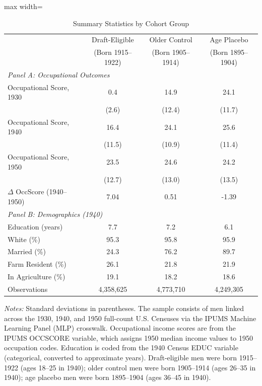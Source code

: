 \begin{table}[htbp]
\centering
\caption{Summary Statistics by Cohort Group}
\label{tab:sumstats}
\begin{adjustbox}{max width=\textwidth}
\begin{tabular}{lccc}
\toprule
 & Draft-Eligible & Older Control & Age Placebo \\
 & (Born 1915--1922) & (Born 1905--1914) & (Born 1895--1904) \\
\midrule
\multicolumn{4}{l}{\textit{Panel A: Occupational Outcomes}} \\[3pt]
Occupational Score, 1930 & 0.4 & 14.9 & 24.1 \\
 & (2.6) & (12.4) & (11.7) \\[3pt]
Occupational Score, 1940 & 16.4 & 24.1 & 25.6 \\
 & (11.5) & (10.9) & (11.4) \\[3pt]
Occupational Score, 1950 & 23.5 & 24.6 & 24.2 \\
 & (12.7) & (13.0) & (13.5) \\[3pt]
$\Delta$ OccScore (1940--1950) & 7.04 & 0.51 & -1.39 \\
\midrule
\multicolumn{4}{l}{\textit{Panel B: Demographics (1940)}} \\[3pt]
Education (years) & 7.7 & 7.2 & 6.1 \\
White (\%) & 95.3 & 95.8 & 95.9 \\
Married (\%) & 24.3 & 76.2 & 89.7 \\
Farm Resident (\%) & 26.1 & 21.8 & 21.9 \\
In Agriculture (\%) & 19.1 & 18.2 & 18.6 \\
\midrule
Observations & 4,358,625 & 4,773,710 & 4,249,305 \\
\bottomrule
\end{tabular}
\end{adjustbox}
\begin{tablenotes}
\small
\item \textit{Notes:} Standard deviations in parentheses. The sample consists of men linked across the 1930, 1940, and 1950 full-count U.S. Censuses via the IPUMS Machine Learning Panel (MLP) crosswalk. Occupational income scores are from the IPUMS OCCSCORE variable, which assigns 1950 median income values to 1950 occupation codes. Education is coded from the 1940 Census EDUC variable (categorical, converted to approximate years). Draft-eligible men were born 1915--1922 (ages 18--25 in 1940); older control men were born 1905--1914 (ages 26--35 in 1940); age placebo men were born 1895--1904 (ages 36--45 in 1940).
\end{tablenotes}
\end{table}
